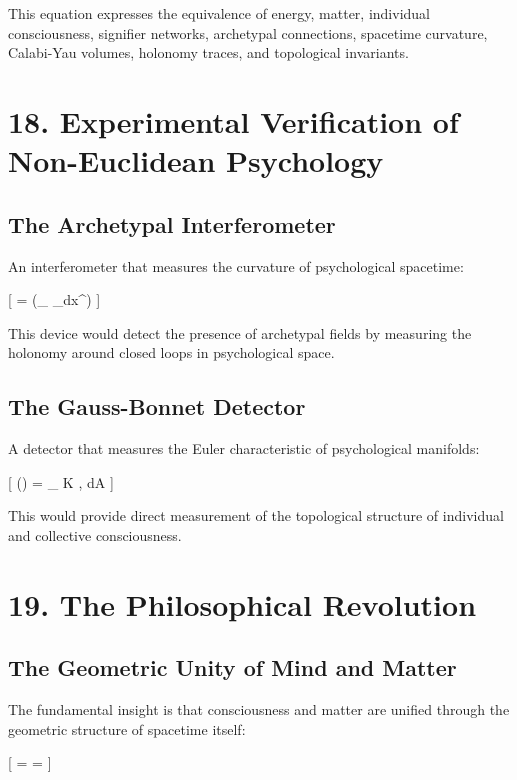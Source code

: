 \documentclass[12pt]{article}
\begin{document}
This equation expresses the equivalence of energy, matter, individual consciousness, signifier networks, archetypal connections, spacetime curvature, Calabi-Yau volumes, holonomy traces, and topological invariants.

\section*{18. Experimental Verification of Non-Euclidean Psychology}

\subsection*{The Archetypal Interferometer}

An interferometer that measures the curvature of psychological spacetime:

[
 = \cos\left(\oint_{} _\mu dx^\mu\right)
]

This device would detect the presence of archetypal fields by measuring the holonomy around closed loops in psychological space.

\subsection*{The Gauss-Bonnet Detector}

A detector that measures the Euler characteristic of psychological manifolds:

[
\chi() =  \int_{} K , dA
]

This would provide direct measurement of the topological structure of individual and collective consciousness.

\section*{19. The Philosophical Revolution}

\subsection*{The Geometric Unity of Mind and Matter}

The fundamental insight is that consciousness and matter are unified through the geometric structure of spacetime itself:

[
 =  = 
]
\end{document}
